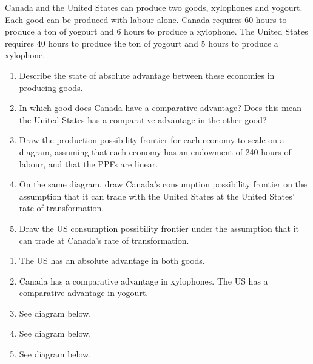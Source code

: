 \begin{enumialphparenastyle}
\begin{econex}\label{ex:ch15ex2}
Canada and the United States can produce two goods, xylophones and yogourt. Each good can be produced with labour alone. Canada requires 60 hours to produce a ton of yogourt and 6 hours to produce a xylophone. The United States requires 40 hours to produce the ton of yogourt and 5 hours to produce a xylophone.
\begin{enumerate}
\item  Describe the state of absolute advantage between these economies in producing goods.
\item  In which good does Canada have a comparative advantage? Does this mean the United States has a comparative advantage in the other good?
\item  Draw the production possibility frontier for each economy to scale on a diagram, assuming that each economy has an endowment of 240 hours of labour, and that the PPFs are linear.
\item  On the same diagram, draw Canada's consumption possibility frontier on the assumption that it can trade with the United States at the United States' rate of transformation. 
\item  Draw the US consumption possibility frontier under the assumption that it can trade at Canada's rate of transformation.
\end{enumerate}
\begin{econsolution}
\begin{enumerate}
\item	The US has an absolute advantage in both goods.
\item	Canada has a comparative advantage in xylophones. The US has a comparative advantage in yogourt.
\item	See diagram below.
\item	See diagram below.
\item   See diagram below.
\end{enumerate}
\begin{center*}
\end{center*}
\end{econsolution}
\end{econex}
\end{enumialphparenastyle}
